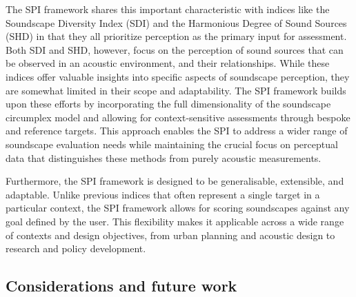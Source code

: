 \documentclass[
  authoryear,
  3p]{elsarticle}
\begin{document}
The SPI framework shares this important characteristic with indices like
the Soundscape Diversity Index (SDI) \citep{Liu2014Effects} and the
Harmonious Degree of Sound Sources (SHD) \citep{Guo2023Harmonious} in
that they all prioritize perception as the primary input for assessment.
Both SDI and SHD, however, focus on the perception of sound sources that
can be observed in an acoustic environment, and their relationships.
While these indices offer valuable insights into specific aspects of
soundscape perception, they are somewhat limited in their scope and
adaptability. The SPI framework builds upon these efforts by
incorporating the full dimensionality of the soundscape circumplex model
and allowing for context-sensitive assessments through bespoke and
reference targets. This approach enables the SPI to address a wider
range of soundscape evaluation needs while maintaining the crucial focus
on perceptual data that distinguishes these methods from purely acoustic
measurements.

Furthermore, the SPI framework is designed to be generalisable,
extensible, and adaptable. Unlike previous indices that often represent
a single target in a particular context, the SPI framework allows for
scoring soundscapes against any goal defined by the user. This
flexibility makes it applicable across a wide range of contexts and
design objectives, from urban planning and acoustic design to research
and policy development.

\subsection{Considerations and future work}\label{limitations}
\end{document}

